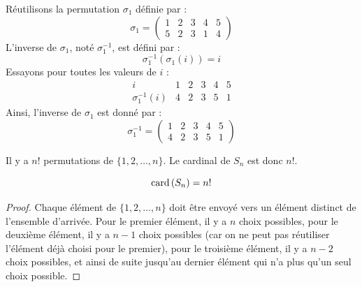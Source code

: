 \documentclass[11pt,a4paper]{report}
\begin{document}
\begin{example}
    Réutilisons la permutation $\sigma_1$ définie par :
    $$
\sigma_1 = \left(\begin{matrix} 1 & 2 & 3 & 4 & 5 \\ 5 & 2 & 3 & 1 & 4 \end{matrix}\right)
    $$
    L'inverse de $\sigma_1$, noté $\sigma_1^{-1}$, est défini par :
    $$
\sigma_1^{-1}(\sigma_1(i)) = i
    $$
    Essayons pour toutes les valeurs de $i$ :
    \[
\begin{array}{c|ccccc}
    i & 1 & 2 & 3 & 4 & 5 \\
    \sigma_1^{-1}(i) & 4 & 2 & 3 & 5 & 1
\end{array}
    \]
    Ainsi, l'inverse de $\sigma_1$ est donné par :
    $$
\sigma_1^{-1} = \left(\begin{matrix} 1 & 2 & 3 & 4 & 5 \\ 4 & 2 & 3 & 5 & 1 \end{matrix}\right)
    $$
\end{example}

\begin{property}
    Il y a $n!$ permutations de $\{1, 2, \dots, n\}$. Le cardinal de $S_n$ est donc $n!$.

    $$\mathrm{card}\left(S_n\right) = n!$$
\end{property}

\begin{proof}
    Chaque élément de $\{1, 2, \dots, n\}$ doit être envoyé vers un élément distinct de l'ensemble d'arrivée. Pour le premier élément, il y a $n$ choix possibles, pour le deuxième élément, il y a $n-1$ choix possibles (car on ne peut pas réutiliser l'élément déjà choisi pour le premier), pour le troisième élément, il y a $n-2$ choix possibles, et ainsi de suite jusqu'au dernier élément qui n'a plus qu'un seul choix possible.
\end{proof}
\end{document}
